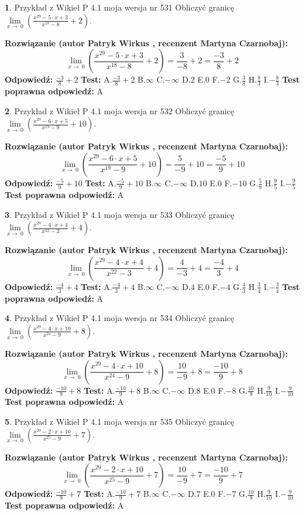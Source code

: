 \documentclass[12pt, a4paper]{article}
\theoremstyle{definition} %
\newtheorem{zad}{}
\newcommand{\zadStart}[1]{\begin{zad}#1\newline}
\newcommand{\zadStop}{\end{zad}}
\newcommand{\rozwStart}[2]{\noindent \textbf{Rozwiązanie (autor #1 , recenzent #2): }\newline}
\newcommand{\rozwStop}{\newline}
\newcommand{\odpStart}{\noindent \textbf{Odpowiedź:}\newline}
\newcommand{\odpStop}{\newline}
\newcommand{\testStart}{\noindent \textbf{Test:}\newline}
\newcommand{\testStop}{\newline}
\newcommand{\kluczStart}{\noindent \textbf{Test poprawna odpowiedź:}\newline}
\newcommand{\kluczStop}{\newline}
\begin{document}
\zadStart{Przykład z Wikieł P 4.1 moja wersja nr 531}
Obliczyć granicę $\lim\limits_{x\to\ 0}(\frac{x^{29}-5 \cdot x +3}{x^{18}-8}+2)$.
\zadStop
\rozwStart{Patryk Wirkus}{Martyna Czarnobaj}
$$\lim\limits_{x\to\ 0}(\frac{x^{29}-5 \cdot x +3}{x^{18}-8}+2)=\frac{3}{-8}+2=\frac{-3}{8}+2$$
\rozwStop
\odpStart
$\frac{-3}{8}+2$
\odpStop
\testStart
A.$\frac{-3}{8}+2$
B.$\infty$
C.$-\infty$
D.$2$
E.$0$
F.$-2$
G.$\frac{3}{8}$
H.$\frac{8}{3}$
I.$-\frac{8}{3}$
\testStop
\kluczStart
A
\kluczStop



\zadStart{Przykład z Wikieł P 4.1 moja wersja nr 532}
Obliczyć granicę $\lim\limits_{x\to\ 0}(\frac{x^{29}-6 \cdot x +5}{x^{19}-9}+10)$.
\zadStop
\rozwStart{Patryk Wirkus}{Martyna Czarnobaj}
$$\lim\limits_{x\to\ 0}(\frac{x^{29}-6 \cdot x +5}{x^{19}-9}+10)=\frac{5}{-9}+10=\frac{-5}{9}+10$$
\rozwStop
\odpStart
$\frac{-5}{9}+10$
\odpStop
\testStart
A.$\frac{-5}{9}+10$
B.$\infty$
C.$-\infty$
D.$10$
E.$0$
F.$-10$
G.$\frac{5}{9}$
H.$\frac{9}{5}$
I.$-\frac{9}{5}$
\testStop
\kluczStart
A
\kluczStop



\zadStart{Przykład z Wikieł P 4.1 moja wersja nr 533}
Obliczyć granicę $\lim\limits_{x\to\ 0}(\frac{x^{29}-4 \cdot x +4}{x^{22}-3}+4)$.
\zadStop
\rozwStart{Patryk Wirkus}{Martyna Czarnobaj}
$$\lim\limits_{x\to\ 0}(\frac{x^{29}-4 \cdot x +4}{x^{22}-3}+4)=\frac{4}{-3}+4=\frac{-4}{3}+4$$
\rozwStop
\odpStart
$\frac{-4}{3}+4$
\odpStop
\testStart
A.$\frac{-4}{3}+4$
B.$\infty$
C.$-\infty$
D.$4$
E.$0$
F.$-4$
G.$\frac{4}{3}$
H.$\frac{3}{4}$
I.$-\frac{3}{4}$
\testStop
\kluczStart
A
\kluczStop



\zadStart{Przykład z Wikieł P 4.1 moja wersja nr 534}
Obliczyć granicę $\lim\limits_{x\to\ 0}(\frac{x^{29}-4 \cdot x +10}{x^{24}-9}+8)$.
\zadStop
\rozwStart{Patryk Wirkus}{Martyna Czarnobaj}
$$\lim\limits_{x\to\ 0}(\frac{x^{29}-4 \cdot x +10}{x^{24}-9}+8)=\frac{10}{-9}+8=\frac{-10}{9}+8$$
\rozwStop
\odpStart
$\frac{-10}{9}+8$
\odpStop
\testStart
A.$\frac{-10}{9}+8$
B.$\infty$
C.$-\infty$
D.$8$
E.$0$
F.$-8$
G.$\frac{10}{9}$
H.$\frac{9}{10}$
I.$-\frac{9}{10}$
\testStop
\kluczStart
A
\kluczStop



\zadStart{Przykład z Wikieł P 4.1 moja wersja nr 535}
Obliczyć granicę $\lim\limits_{x\to\ 0}(\frac{x^{29}-2 \cdot x +10}{x^{25}-9}+7)$.
\zadStop
\rozwStart{Patryk Wirkus}{Martyna Czarnobaj}
$$\lim\limits_{x\to\ 0}(\frac{x^{29}-2 \cdot x +10}{x^{25}-9}+7)=\frac{10}{-9}+7=\frac{-10}{9}+7$$
\rozwStop
\odpStart
$\frac{-10}{9}+7$
\odpStop
\testStart
A.$\frac{-10}{9}+7$
B.$\infty$
C.$-\infty$
D.$7$
E.$0$
F.$-7$
G.$\frac{10}{9}$
H.$\frac{9}{10}$
I.$-\frac{9}{10}$
\testStop
\kluczStart
A
\kluczStop
\end{document}
